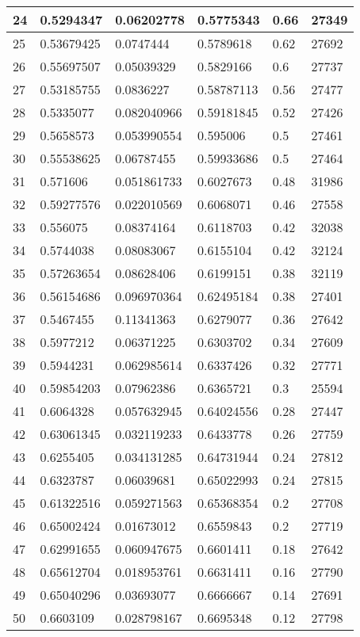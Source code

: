\begin{longtable}{|l|l|l|l|l|l|}
24 & 0.5294347 & 0.06202778 & 0.5775343 & 0.66 & 27349 \\ \hline 
25 & 0.53679425 & 0.0747444 & 0.5789618 & 0.62 & 27692 \\ \hline 
26 & 0.55697507 & 0.05039329 & 0.5829166 & 0.6 & 27737 \\ \hline 
27 & 0.53185755 & 0.0836227 & 0.58787113 & 0.56 & 27477 \\ \hline 
28 & 0.5335077 & 0.082040966 & 0.59181845 & 0.52 & 27426 \\ \hline 
29 & 0.5658573 & 0.053990554 & 0.595006 & 0.5 & 27461 \\ \hline 
30 & 0.55538625 & 0.06787455 & 0.59933686 & 0.5 & 27464 \\ \hline 
31 & 0.571606 & 0.051861733 & 0.6027673 & 0.48 & 31986 \\ \hline 
32 & 0.59277576 & 0.022010569 & 0.6068071 & 0.46 & 27558 \\ \hline 
33 & 0.556075 & 0.08374164 & 0.6118703 & 0.42 & 32038 \\ \hline 
34 & 0.5744038 & 0.08083067 & 0.6155104 & 0.42 & 32124 \\ \hline 
35 & 0.57263654 & 0.08628406 & 0.6199151 & 0.38 & 32119 \\ \hline 
36 & 0.56154686 & 0.096970364 & 0.62495184 & 0.38 & 27401 \\ \hline 
37 & 0.5467455 & 0.11341363 & 0.6279077 & 0.36 & 27642 \\ \hline 
38 & 0.5977212 & 0.06371225 & 0.6303702 & 0.34 & 27609 \\ \hline 
39 & 0.5944231 & 0.062985614 & 0.6337426 & 0.32 & 27771 \\ \hline 
40 & 0.59854203 & 0.07962386 & 0.6365721 & 0.3 & 25594 \\ \hline 
41 & 0.6064328 & 0.057632945 & 0.64024556 & 0.28 & 27447 \\ \hline 
42 & 0.63061345 & 0.032119233 & 0.6433778 & 0.26 & 27759 \\ \hline 
43 & 0.6255405 & 0.034131285 & 0.64731944 & 0.24 & 27812 \\ \hline 
44 & 0.6323787 & 0.06039681 & 0.65022993 & 0.24 & 27815 \\ \hline 
45 & 0.61322516 & 0.059271563 & 0.65368354 & 0.2 & 27708 \\ \hline 
46 & 0.65002424 & 0.01673012 & 0.6559843 & 0.2 & 27719 \\ \hline 
47 & 0.62991655 & 0.060947675 & 0.6601411 & 0.18 & 27642 \\ \hline 
48 & 0.65612704 & 0.018953761 & 0.6631411 & 0.16 & 27790 \\ \hline 
49 & 0.65040296 & 0.03693077 & 0.6666667 & 0.14 & 27691 \\ \hline 
50 & 0.6603109 & 0.028798167 & 0.6695348 & 0.12 & 27798 \\ \hline 
\end{longtable}